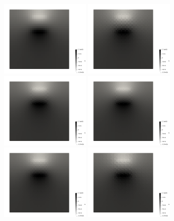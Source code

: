 \documentclass[a4paper,12pt]{article}
\begin{document}
\begin{figure}[t]
\centering
\includegraphics[width=4.3cm]{../results/exp08/fig16x16_reduced/press.0000.png}
\includegraphics[width=4.3cm]{../results/exp08/fig16x16_reduced/press.0001.png}
\includegraphics[width=4.3cm]{../results/exp08/fig16x16_reduced/press.0002.png}
\includegraphics[width=4.3cm]{../results/exp08/fig16x16_reduced/press.0003.png}
\includegraphics[width=4.3cm]{../results/exp08/fig16x16_reduced/press.0004.png}
\includegraphics[width=4.3cm]{../results/exp08/fig16x16_reduced/press.0005.png}

\end{figure}
\end{document}
